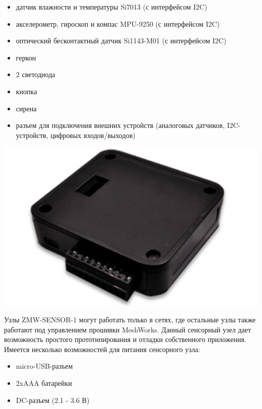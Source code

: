 \documentclass[11pt]{article}
\begin{document}
\begin{minipage}{.6\textwidth}
  \begin{itemize}
    \item датчик влажности и температуры Si7013 (с интерфейсом I2C)
    \item акселерометр, гироскоп и компас MPU-9250 (с интерфейсом I2C)
    \item оптический бесконтактный датчик Si1143-M01 (с интерфейсом I2C)
    \item геркон
    \item 2 светодиода
    \item кнопка
    \item сирена
    \item разъем для подключения внешних устройств (аналоговых датчиков, I2C-устройств,
    цифровых входов/выходов)
  \end{itemize}
\end{minipage}
\begin{minipage}{.2\textwidth}
        \includegraphics[width=1.2\textwidth]{sensor_node.png}
\end{minipage}

Узлы ZMW-SENSOR-1 могут работать только в сетях, где остальные узлы также работают 
под управлением прошивки MeshWorks. Данный сенсорный узел дает возможность 
простого прототипирования и отладки собственного приложения.
Имеется несколько возможностей для питания сенсорного узла:
\begin{itemize}
 \item micro-USB-разъем
 \item 2xAAA батарейки
 \item DC-разъем (2.1 - 3.6 В)
\end{itemize}
\end{document}
